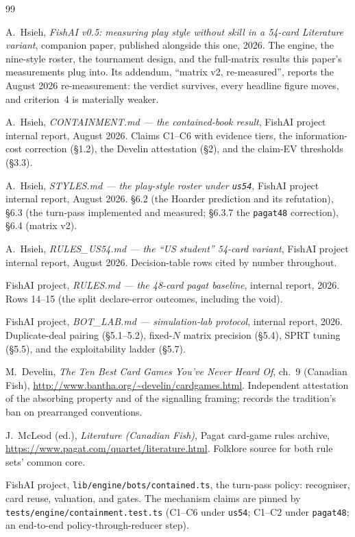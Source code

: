 \documentclass[11pt]{article}
\newcommand{\code}[1]{\texttt{#1}}
\begin{document}
\begin{thebibliography}{99}

A.~Hsieh,
\emph{FishAI v0.5: measuring play style without skill in a 54-card Literature
variant},
companion paper, published alongside this one, 2026. The engine, the
nine-style roster, the tournament design, and the full-matrix results this
paper's measurements plug into. Its addendum, ``matrix v2, re-measured'',
reports the August 2026 re-measurement: the verdict survives, every headline
figure moves, and criterion~4 is materially weaker.

A.~Hsieh,
\emph{CONTAINMENT.md --- the contained-book result},
FishAI project internal report, August 2026.
Claims C1--C6 with evidence tiers, the information-cost correction (\S1.2),
the Develin attestation (\S2), and the claim-EV thresholds (\S3.3).

A.~Hsieh,
\emph{STYLES.md --- the play-style roster under \code{us54}},
FishAI project internal report, August 2026.
\S6.2 (the Hoarder prediction and its refutation), \S6.3 (the turn-pass
implemented and measured; \S6.3.7 the \code{pagat48} correction), \S6.4
(matrix v2).

A.~Hsieh,
\emph{RULES\_US54.md --- the ``US student'' 54-card variant},
FishAI project internal report, August 2026. Decision-table rows cited by
number throughout.

FishAI project,
\emph{RULES.md --- the 48-card pagat baseline},
internal report, 2026. Rows 14--15 (the split declare-error outcomes,
including the void).

FishAI project,
\emph{BOT\_LAB.md --- simulation-lab protocol},
internal report, 2026. Duplicate-deal pairing (\S5.1--5.2), fixed-$N$ matrix
precision (\S5.4), SPRT tuning (\S5.5), and the exploitability ladder
(\S5.7).

M.~Develin,
\emph{The Ten Best Card Games You've Never Heard Of}, ch.~9 (Canadian Fish),
\url{http://www.bantha.org/~develin/cardgames.html}.
Independent attestation of the absorbing property and of the signalling
framing; records the tradition's ban on prearranged conventions.

J.~McLeod (ed.),
\emph{Literature (Canadian Fish)},
Pagat card-game rules archive,
\url{https://www.pagat.com/quartet/literature.html}.
Folklore source for both rule sets' common core.

FishAI project,
\code{lib/engine/bots/contained.ts},
the turn-pass policy: recogniser, card reuse, valuation, and gates. The
mechanism claims are pinned by \code{tests/engine/containment.test.ts}
(C1--C6 under \code{us54}; C1--C2 under \code{pagat48}; an end-to-end
policy-through-reducer step).


\end{thebibliography}
\end{document}

